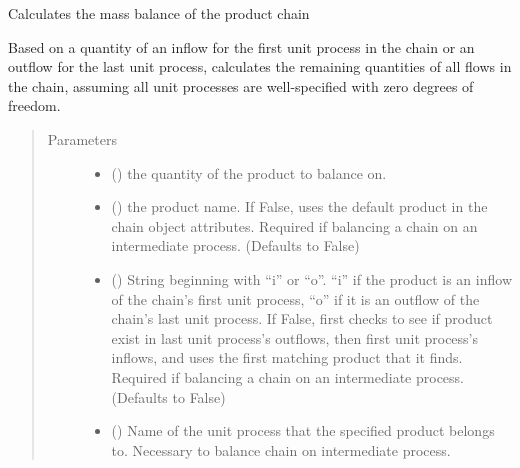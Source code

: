 \documentclass[a4paper,10pt,english]{sphinxmanual}
\begin{document}
\begin{fulllineitems}
\label{\detokenize{chain:processchain.ProductChain.balance}}
Calculates the mass balance of the product chain

Based on a quantity of an inflow for the first unit process in the
chain or an outflow for the last unit process, calculates the remaining
quantities of all flows in the chain, assuming all unit processes
are well-specified with zero degrees of freedom.
\begin{quote}\begin{description}
\item[{Parameters}] \leavevmode\begin{itemize}
\item {} 
 () \textendash{} the quantity of the product to balance on.

\item {} 
 () \textendash{} the product name. If False, uses the default
product in the chain object attributes. Required if balancing a
chain on an intermediate process.
(Defaults to False)

\item {} 
 () \textendash{} String beginning with “i” or “o”. “i” if the product
is an inflow of the chain’s first unit process, “o” if it is an
outflow of the chain’s last unit process. If False, first checks
to see if product exist in last unit process’s outflows, then
first unit process’s inflows, and uses the first matching
product that it finds. Required if balancing a chain on an
intermediate process.
(Defaults to False)

\item {} 
 () \textendash{} Name of the unit process that the specified product
belongs to. Necessary to balance chain on intermediate process.


\end{itemize}
\end{description}
\end{quote}
\end{fulllineitems}
\end{document}
